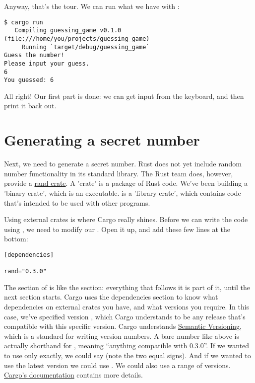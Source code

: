 \blank

Anyway, that's the tour. We can run what we have with :

\begin{verbatim}
$ cargo run
   Compiling guessing_game v0.1.0 (file:///home/you/projects/guessing_game)
     Running `target/debug/guessing_game`
Guess the number!
Please input your guess.
6
You guessed: 6
\end{verbatim}

All right! Our first part is done: we can get input from the keyboard, and then print it back out.

\section{Generating a secret number}

Next, we need to generate a secret number. Rust does not yet include random number functionality in its standard library. 
The Rust team does, however, provide a \href{https://crates.io/crates/rand}{rand crate}. A 'crate' is a package of Rust 
code. We've been building a 'binary crate', which is an executable.  is a 'library crate', which contains code 
that's intended to be used with other programs.

\blank

Using external crates is where Cargo really shines. Before we can write the code using , we need to modify our 
. Open it up, and add these few lines at the bottom:

\begin{verbatim}
[dependencies]

rand="0.3.0"
\end{verbatim}

The \code{[dependencies]} section of  is like the \code{[package]} section: everything that follows it is part 
of it, until the next section starts. Cargo uses the dependencies section to know what dependencies on external crates you have, 
and what versions you require. In this case, we've specified version , which Cargo understands to be any release that's
compatible with this specific version. Cargo understands \href{http://semver.org/}{Semantic Versioning}, which is a standard for
writing version numbers. A bare number like above is actually shorthand for , meaning \enquote{anything compatible 
with 0.3.0}. If we wanted to use only  exactly, we could say  (note the two equal signs). And if we
wanted to use the latest version we could use \code{*}. We could also use a range of versions. 
\href{http://doc.crates.io/crates-io.html}{Cargo's documentation} contains more details.

